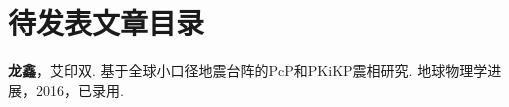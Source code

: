 \chapter*{待发表文章目录}

\vspace{30pt}

\textbf{\songti 龙鑫}，艾印双. 基于全球小口径地震台阵的PcP和PKiKP震相研究. 地球物理学进展，2016，已录用.